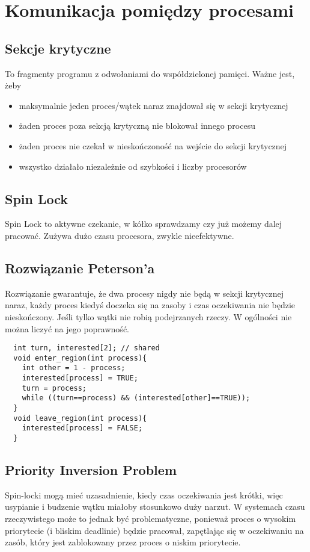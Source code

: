 \section{Komunikacja pomiędzy procesami}
\subsection{Sekcje krytyczne}
To fragmenty programu z odwołaniami do współdzielonej pamięci. Ważne jest, żeby
\begin{itemize}
	\item maksymalnie jeden proces/wątek naraz znajdował się w sekcji krytycznej
	\item żaden proces poza sekcją krytyczną nie blokował innego procesu
	\item żaden proces nie czekał w nieskończoność na wejście do sekcji krytycznej
	\item wszystko działało niezależnie od szybkości i liczby procesorów
\end{itemize}
\subsection{Spin Lock}
Spin Lock to aktywne czekanie, w kółko sprawdzamy czy już możemy dalej pracować. Zużywa dużo czasu procesora, zwykle nieefektywne.
\subsection{Rozwiązanie Peterson'a}
Rozwiązanie gwarantuje, że dwa procesy nigdy nie będą w sekcji krytycznej naraz, każdy proces kiedyś doczeka się na zasoby i czas oczekiwania nie będzie nieskończony. Jeśli tylko wątki nie robią podejrzanych rzeczy. W ogólności nie można liczyć na jego poprawność.
\begin{verbatim}
  int turn, interested[2]; // shared
  void enter_region(int process){
    int other = 1 - process;
    interested[process] = TRUE;
    turn = process;
    while ((turn==process) && (interested[other]==TRUE));
  }
  void leave_region(int process){
    interested[process] = FALSE;
  }
\end{verbatim}
\subsection{Priority Inversion Problem}
Spin-locki mogą mieć uzasadnienie, kiedy czas oczekiwania jest krótki, więc usypianie i budzenie wątku miałoby stosunkowo duży narzut. W systemach czasu rzeczywistego może to jednak być problematyczne, ponieważ proces o wysokim priorytecie (i bliskim deadlinie) będzie pracował, zapętlając się w oczekiwaniu na zasób, który jest zablokowany przez proces o niskim priorytecie.
